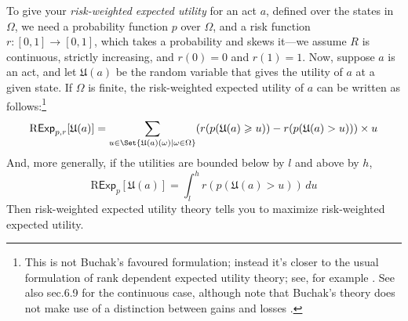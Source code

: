 \documentclass[a4paper]{article}
\newcommand\Exp{\mathsf{Exp}}
\newcommand\RExp{\mathrm{R}\Exp} %
\newcommand\U{\mathfrak{U}} %
\newcommand\SetDelimiter[1][]{
	\nonscript\,#1\vert \allowbreak \nonscript\,\mathopen{}}
\providecommand\given{\SetDelimiter}
\renewcommand{\geq}{\geqslant}
\newenvironment{CCM rewritten}
{\begingroup\color{blue}} %
{\endgroup}              %
\begin{document}
To give your \textit{risk-weighted expected utility} for an act $a$, defined over the states in $\Omega$, we need a probability function $p$ over $\Omega$, and a risk function $r : [0, 1] \rightarrow [0, 1]$, which takes a probability and skews it---we assume $R$ is continuous, strictly increasing, and $r(0)= 0$ and $r(1) = 1$. Now, suppose $a$ is an act, and let $\U(a)$ be the random variable that gives the utility of $a$ at a given state. 
If $\Omega$ is finite, the risk-weighted expected utility of $a$ can be written as follows:\footnote{This is not Buchak's favoured formulation; instead it's closer to the usual formulation of rank dependent expected utility theory; see, for example \citep[ch.6]{wakker2010prospect}.  See also sec.6.9 for the continuous case, although note that Buchak's theory does not make use of a distinction between gains and losses \citep[see][p59]{buchak2014rr}. }
$$
\RExp_{p, r}[\U(a)] = \sum_{u \in \Set{\U(a)(\omega)\given \omega \in \Omega}} (r(p(\U(a) \geq u)) - r(p(\U(a) > u)))\times u
$$
And, more generally, if the utilities are bounded below by $l$ and above by $h$,
$$
\RExp_p[\U(a)] = \int^h_{l} r(p(\U(a) > u))\, du
$$
Then risk-weighted expected utility theory tells you to maximize risk-weighted expected utility.


\end{document}

